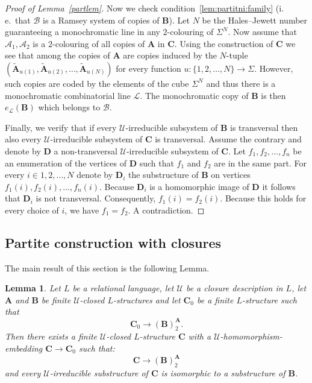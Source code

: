\documentclass{elsarticle}
\newcommand{\ie}{i.\,e.}
\def\str#1{\mathbf {#1}}
\theoremstyle{plain}
\newtheorem{lemma}[theorem]{Lemma}
\theoremstyle{definition}
\theoremstyle{remark}
\begin{document}
\begin{proof}[Proof of Lemma~\ref{partlem}]
Now we check condition~\ref{lem:partitni:family} (\ie{}\ that $\mathcal B$ is a Ramsey system of copies of $\str{B}$).
 Let $N$ be the Hales--Jewett number guaranteeing a monochromatic line in any $2$-colouring of $\Sigma^N$.
Now assume that $\mathcal{A}_1, \mathcal{A}_2$ is a $2$-colouring of all copies of $\str{A}$ in $\str{C}$.
Using the construction of $\str{C}$ we see that  among the copies of $\str{A}$ are copies induced by the $N$-tuple $(\widetilde{\str{A}}_{u(1)}, \widetilde{\str{A}}_{u(2)},\ldots,\widetilde{\str{A}}_{u(N)})$ for every function $u\colon\{1,2,\ldots, N\}\to \Sigma$. However, such copies are coded by the elements of the cube $\Sigma^N$ and thus there is a monochromatic 
combinatorial line $\mathcal L$. The monochromatic copy of $\str{B}$ is then $e_\mathcal L(\str B)$ which belongs to $\mathcal B$.

\medskip

Finally, we verify that if every $\mathcal U$-irreducible subsystem of $\str{B}$ is transversal
then also every $\mathcal U$-irreducible subsystem of $\str{C}$ is transversal. Assume the contrary
and denote by $\str{D}$ a non-transversal $\mathcal U$-irreducible subsystem of $\str{C}$.
Let $f_1,f_2,\ldots, f_n$ be an enumeration of the vertices of $\str{D}$ such that $f_1$ and $f_2$ are in the same part.  For every $i\in 1,2,\ldots, N$
denote by $\str{D}_i$ the  substructure of $\str{B}$ on vertices $f_1(i),f_2(i),\ldots, f_n(i)$.
Because $\str{D}_i$ is a homomorphic image of $\str{D}$ it follows that $\str{D}_i$ is not transversal.
Consequently, $f_1(i)=f_2(i)$.  Because this holds for every choice of $i$, we have $f_1=f_2$. A contradiction.
\end{proof}
\subsection{Partite construction with closures}
\label{sec:partiteconstruction}
The main result of this section is the following Lemma.
\begin{lemma}\label{lem:closures}
Let $L$ be a relational language,
let $\mathcal U$ be a closure description in $L$, let $\str{A}$ and $\str{B}$ be finite $\mathcal U$-closed
$L$-structures and let $\str{C}_0$ be a finite $L$-structure such that
$$
\str{C}_0 \longrightarrow (\str{B})^{\str{A}}_2.
$$
Then there exists a finite $\mathcal U$-closed $L$-structure $\str{C}$ with a $\mathcal U$-homomorphism-embed{\-}ding $\str{C}\to \str{C}_0$ such that:
$$
\str{C} \longrightarrow (\str{B})^{\str{A}}_2
$$
and every $\mathcal U$-irreducible substructure of $\str{C}$ is isomorphic to a substructure of $\str{B}$.
\end{lemma}
\end{document}

